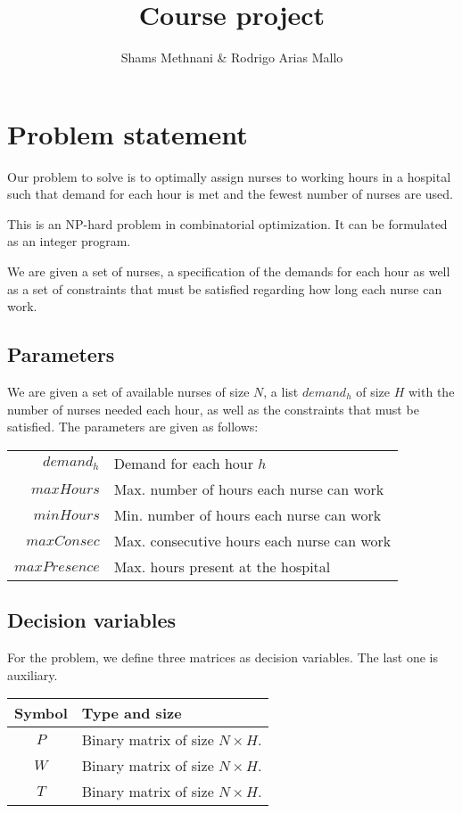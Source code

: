\documentclass[12pt,a4paper]{article}
\title{Course project}
\author{Shams Methnani \& Rodrigo Arias Mallo}
\begin{document}
\maketitle

\section{Problem statement}


Our problem to solve is to optimally assign nurses to working hours in a 
hospital such that demand for each hour is met and the fewest number of nurses 
are used.

This is an NP-hard problem in combinatorial optimization. It can be formulated 
as an integer program.

We are given a set of nurses, a specification of the demands for each hour as 
well as a set of constraints that must be satisfied regarding how long each 
nurse can work.

\subsection{Parameters}

We are given a set of available nurses of size $N$, a list ${demand}_h$ of size 
$H$ with the number of nurses needed each hour, as well as the constraints that 
must be satisfied. The parameters are given as follows:
%
\begin{center}
\begin{tabular}{rl}
$demand_h$ 			&	Demand for each hour $h$ \\
$maxHours$ 			& Max. number of hours each nurse can work \\
$minHours$ 			& Min. number of hours each nurse can work \\
$maxConsec$ 		& Max. consecutive hours each nurse can work \\
$maxPresence$ 	& Max. hours present at the hospital\\
\end{tabular}
\end{center}
%
\subsection{Decision variables}

For the problem, we define three matrices as decision variables. The last one is
auxiliary.
%
\begin{table}[h]
\centering
\begin{tabular}{c l}
\toprule
Symbol & Type and size \\
\midrule
$P$ & Binary matrix of size $N \times H$.\\
$W$ & Binary matrix of size $N \times H$.\\
$T$ & Binary matrix of size $N \times H$.\\
\bottomrule
\end{tabular}
\end{table}
\end{document}
